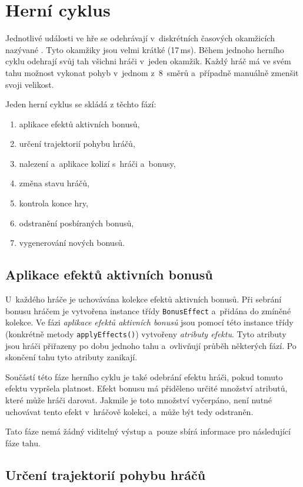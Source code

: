 \section{Herní cyklus}
\label{sec:herni-cyklus}

Jednotlivé události ve hře se odehrávají v~diskrétních časových okamžicích nazývané . Tyto okamžiky jsou velmi krátké (17\,ms). Během jednoho herního cyklu odehrají svůj tah všichni hráči v~jeden okamžik. Každý hráč má ve svém tahu možnost vykonat pohyb v~jednom z~8~směrů a~případně manuálně zmenšit svoji velikost.

Jeden herní cyklus se skládá z těchto fází:
\begin{enumerate}
    \item aplikace efektů aktivních bonusů,
    \item určení trajektorií pohybu hráčů,
    \item nalezení a~aplikace kolizí s~hráči a~bonusy,
    \item změna stavu hráčů,
    \item kontrola konce hry,
    \item odstranění posbíraných bonusů,
    \item vygenerování nových bonusů.
\end{enumerate}

\subsection*{Aplikace efektů aktivních bonusů}

U~každého hráče je uchovávána kolekce efektů aktivních bonusů. Při sebrání bonusu hráčem je vytvořena instance třídy \texttt{BonusEffect} a~přidána do zmíněné kolekce. Ve fázi \emph{aplikace efektů aktivních bonusů} jsou pomocí této instance třídy (konkrétně metody \texttt{applyEffects()}) vytvořeny \emph{atributy efektu}. Tyto atributy jsou hráči přiřazeny po dobu jednoho tahu a~ovlivňují průběh některých fází. Po skončení tahu tyto atributy zanikají.

Součástí této fáze herního cyklu je také odebrání efektu hráči, pokud tomuto efektu vypršela platnost. Efekt bonusu má přiděleno určité množství atributů, které může hráči darovat. Jakmile je toto množství vyčerpáno, není nutné uchovávat tento efekt v~hráčově kolekci, a~může být tedy odstraněn.

Tato fáze nemá žádný viditelný výstup a~pouze sbírá informace pro následující fáze tahu.

\subsection*{Určení trajektorií pohybu hráčů}

